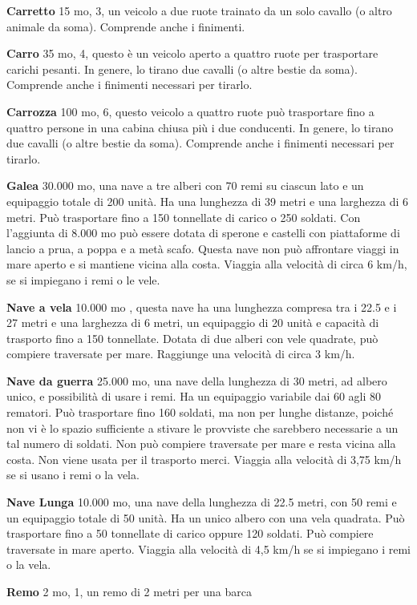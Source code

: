 \documentclass[a4paper,11pt,twoside,openany]{book}
\begin{document}
\textbf{Carretto} 15 mo, 3, un veicolo a due ruote trainato da un solo cavallo (o altro animale da soma). Comprende anche i finimenti.

\textbf{Carro} 35 mo, 4, questo è un veicolo aperto a quattro ruote per trasportare carichi pesanti. In genere, lo tirano due cavalli (o altre bestie da soma). Comprende anche i finimenti necessari per tirarlo.

\textbf{Carrozza} 100 mo, 6, questo veicolo a quattro ruote può trasportare fino a quattro persone in una cabina chiusa più i due conducenti. In genere, lo tirano due cavalli (o altre bestie da soma). Comprende anche i finimenti necessari per tirarlo.

\textbf{Galea} 30.000 mo, una nave a tre alberi con 70 remi su ciascun lato e un equipaggio totale di 200 unità. Ha una lunghezza di 39 metri e una larghezza di 6 metri.
Può trasportare fino a 150 tonnellate di carico o 250 soldati. Con l'aggiunta di 8.000 mo può essere dotata di sperone e castelli con piattaforme di lancio a prua, a poppa e a metà scafo. Questa nave non può affrontare viaggi in mare aperto e si mantiene vicina alla costa.
Viaggia alla velocità di circa 6 km/h, se si impiegano i remi o le vele.

\textbf{Nave a vela} 10.000 mo , questa nave ha una lunghezza compresa tra i 22.5 e i 27 metri e una larghezza di 6 metri, un equipaggio di 20 unità e capacità di trasporto fino a 150 tonnellate. Dotata di due alberi con vele quadrate, può compiere traversate per mare. Raggiunge una velocità di circa 3 km/h.

\textbf{Nave da guerra} 25.000 mo, una nave della lunghezza di 30 metri, ad albero unico, e possibilità di usare i remi. Ha un equipaggio variabile dai 60 agli 80 rematori. Può trasportare fino 160 soldati, ma non per lunghe distanze, poiché non vi è lo spazio sufficiente a stivare le provviste che sarebbero necessarie a un tal numero di soldati. Non può compiere traversate per mare e resta vicina alla costa. Non viene usata per il trasporto merci. Viaggia alla velocità di 3,75 km/h se si usano i remi o la vela.

\textbf{Nave Lunga} 10.000 mo, una nave della lunghezza di 22.5 metri, con 50 remi e un equipaggio totale di 50 unità. Ha un unico albero con una vela quadrata. Può trasportare fino a 50 tonnellate di carico oppure 120 soldati. Può compiere traversate in mare aperto. Viaggia alla velocità di 4,5 km/h se si impiegano i remi o la vela.

\textbf{Remo} 2 mo, 1, un remo di 2 metri per una barca
\end{document}
